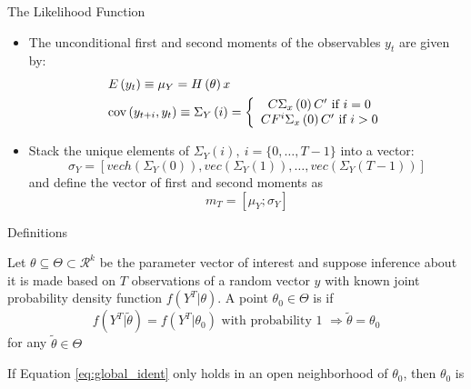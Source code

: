 \begin{frame}{The Likelihood Function}
\begin{itemize}
\item The unconditional first and second moments of the observables $y_t$ are given by:
\[\begin{gathered}
  E\left(y_t\right) \equiv {\mu _Y} = H\left( \theta  \right)x \hfill \\
  \operatorname{cov} \left( {{y_{t + i}},{y_t}} \right) \equiv {\Sigma _Y}\left( i \right) = \left\{ {\begin{array}{*{20}{c}}
  {C{\Sigma _x}\left( 0 \right)C' \text{ if } i = 0} \\
  {C{F^i}{\Sigma _x}\left( 0 \right)C' \text{ if } i > 0}
\end{array}} \right. \hfill \\
\end{gathered} \]
\item Stack the unique elements of ${\Sigma _Y}\left( i \right), \: i =\{0,\ldots,T-1\}$ into a vector:
\begin{equation}
{\sigma _Y} = \left[ {vech\left( {{\Sigma _Y}\left( 0 \right)} \right),vec\left( {{\Sigma _Y}\left( 1 \right)} \right), \ldots ,vec\left( {{\Sigma _Y}\left( {T - 1} \right)} \right)} \right]
\end{equation}
and define the vector of first and second moments as
\begin{equation}
{m_T} = [{\mu _Y};{\sigma _Y}] \label{eq:moment_vector}
\end{equation}
\end{itemize}
\end{frame}

\begin{frame}{Definitions}
\begin{definition}
  Let $\theta\subseteq \Theta \subset \mathcal{R}^k$ be the parameter vector of interest and suppose inference about it is made based on $T$ observations of a random vector $y$ with known joint probability density function $f(Y^T|\theta)$. A point $\theta_0 \in \Theta$ is  if
  \begin{equation}
  f\left( {{Y^T}|\tilde \theta } \right) = f\left( {{Y^T}|{\theta _0}} \right) \text{ with probability 1 } \Rightarrow \tilde \theta  = {\theta _0} \label{eq:global_ident}
  \end{equation}
  for any $\tilde \theta \in \Theta$
\end{definition}
\begin{definition}
  If Equation \eqref{eq:global_ident} only holds in an open neighborhood of $\theta_0$, then $\theta_0$ is 
\end{definition}
\end{frame}

